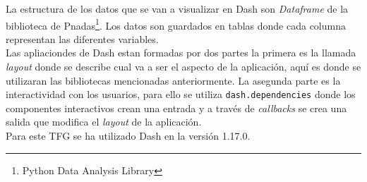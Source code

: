 La estructura de los datos que se van a visualizar en  Dash son\textit{ Dataframe} de la biblioteca de Pnadas\footnote{Python Data Analysis Library}. Los datos son guardados en tablas donde cada columna representan las diferentes variables.\\

Las apliaciondes de Dash estan formadas por dos partes la primera es la llamada \textit{layout} donde se describe cual va a ser el aspecto de la aplicación, aquí es donde se utilizaran las bibliotecas mencionadas anteriormente. La asegunda parte es la interactividad con los usuarios, para ello se utiliza \texttt{dash.dependencies} donde los componentes interactivos crean una entrada y a través de\textit{ callbacks }se crea una salida que modifica el \textit{layout} de la aplicación.\\

Para este TFG se ha utilizado Dash en la versión 1.17.0.















